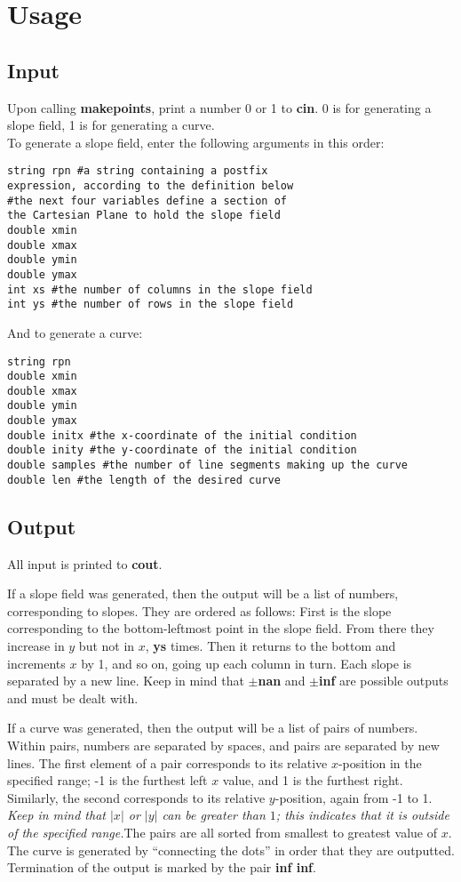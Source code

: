 \documentclass{article}
\begin{document}
\section{Usage}
\subsection{Input}

Upon calling \textbf{makepoints}, print a number 0 or 1 to \textbf{cin}. 0 is for generating a slope field, 1 is for generating a curve.\\
To generate a slope field, enter the following arguments in this order:

\begin{verbatim}
string rpn #a string containing a postfix
expression, according to the definition below
#the next four variables define a section of
the Cartesian Plane to hold the slope field
double xmin
double xmax
double ymin
double ymax
int xs #the number of columns in the slope field
int ys #the number of rows in the slope field
\end{verbatim}

And to generate a curve:
\begin{verbatim}
string rpn
double xmin
double xmax
double ymin
double ymax
double initx #the x-coordinate of the initial condition
double inity #the y-coordinate of the initial condition
double samples #the number of line segments making up the curve
double len #the length of the desired curve
\end{verbatim}
\subsection{Output}
All input is printed to \textbf{cout}.

If a slope field was generated, then the output will be a list of numbers, corresponding to slopes. They are ordered as follows: First is the slope corresponding to the bottom-leftmost point in the slope field. From there they increase in $y$ but not in $x$, \textbf{ys} times. Then it returns to the bottom and increments $x$ by 1, and so on, going up each column in turn. Each slope is separated by a new line. Keep in mind that $\pm$\textbf{nan} and $\pm$\textbf{inf} are possible outputs and must be dealt with.

If a curve was generated, then the output will be a list of pairs of numbers. Within pairs, numbers are separated by spaces, and pairs are separated by new lines. The first element of a pair corresponds to its relative $x$-position in the specified range; -1 is the furthest left $x$ value, and 1 is the furthest right. Similarly, the second corresponds to its relative $y$-position, again from -1 to 1. \textit{Keep in mind that $|x|$ or $|y|$ can be greater than $1$; this indicates that it is outside of the specified range.}The pairs are all sorted from smallest to greatest value of $x$. The curve is generated by ``connecting the dots'' in order that they are outputted. Termination of the output is marked by the pair \textbf{inf inf}.
\end{document}
